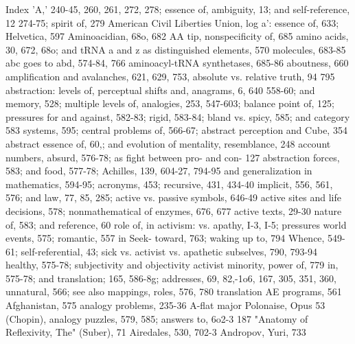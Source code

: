 
                                            Index
'A,' 240-45, 260, 261, 272, 278; essence of,      ambiguity, 13; and self-reference, 12
 274-75; spirit of, 279                           American Civil Liberties Union, log
a': essence of, 633; Helvetica, 597               Aminoacidian, 68o, 682
AA tip, nonspecificity of, 685                    amino acids, 30, 672, 68o; and tRNA
a and z as distinguished elements, 570             molecules, 683-85
abc goes to abd, 574-84, 766                      aminoacyl-tRNA synthetases, 685-86
aboutness, 660                                    amplification and avalanches, 621, 629, 753,
absolute vs. relative truth, 94                    795
abstraction: levels of, perceptual shifts and,    anagrams, 6, 640
 558-60; and memory, 528; multiple levels of,     analogies, 253, 547-603; balance point of,
 125; pressures for and against, 582-83; rigid,    583-84; bland vs. spicy, 585; and category
 583                                               systems, 595; central problems of, 566-67;
abstract perception and Cube, 354 abstract         essence of, 60,; and evolution of mentality,
 resemblance, 248 account numbers, absurd,         576-78; as fight between pro- and con-
 127                                               abstraction forces, 583; and food, 577-78;
Achilles, 139, 604-27, 794-95                      and generalization in mathematics, 594-95;
acronyms, 453; recursive, 431, 434-40              implicit, 556, 561, 576; and law, 77, 85, 285;
active vs. passive symbols, 646-49 active sites    and life decisions, 578; nonmathematical
 of enzymes, 676, 677 active texts, 29-30          nature of, 583; and reference, 60 role of, in
activism: vs. apathy, I-3, I-5; pressures          world events, 575; romantic, 557 in Seek-
 toward, 763; waking up to, 794                    Whence, 549-61; self-referential, 43; sick vs.
activist vs. apathetic subselves, 790, 793-94      healthy, 575-78; subjectivity and objectivity
activist minority, power of, 779                   in, 575-78; and translation; 165, 586-8g;
addresses, 69, 82,-1o6, 167, 305, 351, 360,        unnatural, 566; see also mappings, roles,
 576, 780                                          translation
AE programs, 561 Afghanistan, 575                 analogy problems, 235-36
A-flat major Polonaise, Opus 53 (Chopin),         analogy puzzles, 579, 585; answers to, 6o2-3
 187                                               "Anatomy of Reflexivity, The" (Suber), 71
Airedales, 530, 702-3                             Andropov, Yuri, 733

